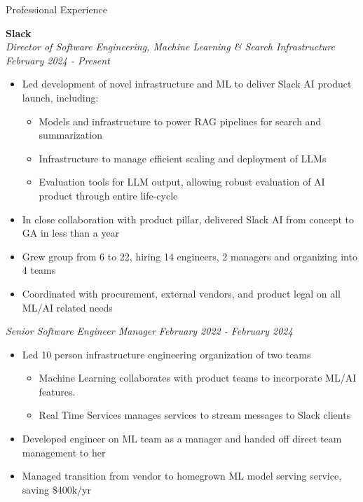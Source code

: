 \documentclass{resume} %
\begin{document}
\begin{rSection}{Professional Experience}

\vspace{0.2em}

{\bf Slack} \\
{\em Director of Software Engineering, Machine Learning \& Search Infrastructure} \hfill {\em February 2024 - Present}  \vspace{0.1em} 
\begin{itemize} \itemsep -0.2em
	\item Led development of novel infrastructure and ML to deliver Slack AI product launch, including:
	\vspace{-0.2em}
        \begin{itemize} \itemsep -0.2em
            \item Models and infrastructure to power RAG pipelines for search and summarization
            \item Infrastructure to manage efficient scaling and deployment of LLMs
            \item Evaluation tools for LLM output, allowing robust evaluation of AI product through entire life-cycle
        \end{itemize}
    \item In close collaboration with product pillar, delivered Slack AI from concept to GA in less than a year
	\item Grew group from 6 to 22, hiring 14 engineers, 2 managers and organizing into 4 teams
    \item Coordinated with procurement, external vendors, and product legal on all ML/AI related needs
\end{itemize}

{\em Senior Software Engineer Manager} \hfill {\em February 2022 - February 2024}  \vspace{0.1em} 
\begin{itemize} \itemsep -0.2em
	\item Led 10 person infrastructure engineering organization of two teams
	\vspace{-0.2em}
        \begin{itemize} \itemsep -0.2em
            \item Machine Learning collaborates with product teams to incorporate ML/AI features.
            \item Real Time Services manages services to stream messages to Slack clients
        \end{itemize}
    \item Developed engineer on ML team as a manager and handed off direct team management to her
    \item Managed transition from vendor to homegrown ML model serving service, saving \$400k/yr
\end{itemize}


\end{rSection}
\end{document}
